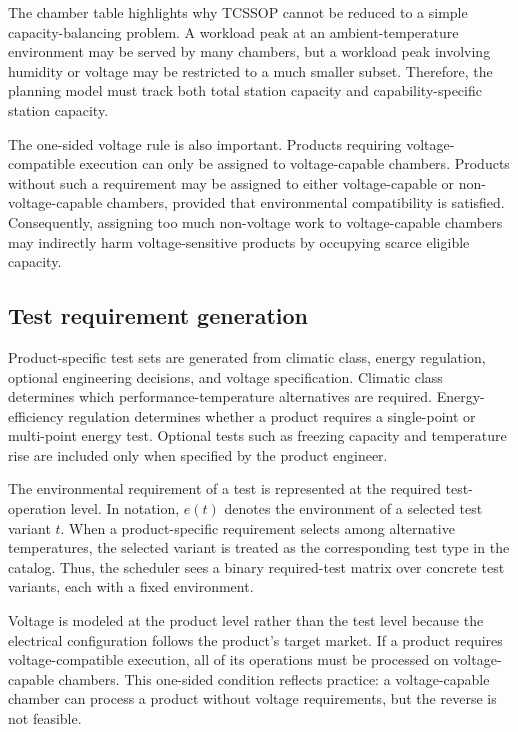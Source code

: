 \documentclass[11pt]{article}
\begin{document}
The chamber table highlights why TCSSOP cannot be reduced to a simple capacity-balancing problem. A workload peak at an ambient-temperature environment may be served by many chambers, but a workload peak involving humidity or voltage may be restricted to a much smaller subset. Therefore, the planning model must track both total station capacity and capability-specific station capacity.

The one-sided voltage rule is also important. Products requiring voltage-compatible execution can only be assigned to voltage-capable chambers. Products without such a requirement may be assigned to either voltage-capable or non-voltage-capable chambers, provided that environmental compatibility is satisfied. Consequently, assigning too much non-voltage work to voltage-capable chambers may indirectly harm voltage-sensitive products by occupying scarce eligible capacity.

\subsection{Test requirement generation}
\label{subsec:req_generation}

Product-specific test sets are generated from climatic class, energy regulation, optional engineering decisions, and voltage specification. Climatic class determines which performance-temperature alternatives are required. Energy-efficiency regulation determines whether a product requires a single-point or multi-point energy test. Optional tests such as freezing capacity and temperature rise are included only when specified by the product engineer.

The environmental requirement of a test is represented at the required test-operation level. In notation, \(e(t)\) denotes the environment of a selected test variant \(t\). When a product-specific requirement selects among alternative temperatures, the selected variant is treated as the corresponding test type in the catalog. Thus, the scheduler sees a binary required-test matrix over concrete test variants, each with a fixed environment.

Voltage is modeled at the product level rather than the test level because the electrical configuration follows the product's target market. If a product requires voltage-compatible execution, all of its operations must be processed on voltage-capable chambers. This one-sided condition reflects practice: a voltage-capable chamber can process a product without voltage requirements, but the reverse is not feasible.
\end{document}
